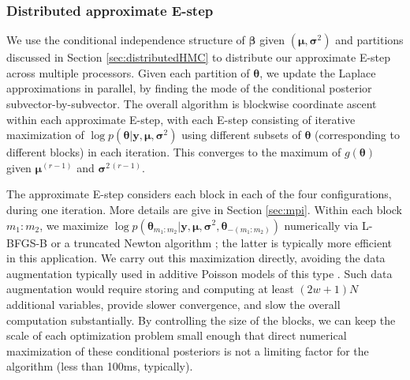 
\subsubsection{Distributed approximate E-step}
\label{sec:parallelization}

We use the conditional independence structure of $\bm \beta$ given $(\bm \mu, \bm \sigma^2)$ and partitions discussed in Section \ref{sec:distributedHMC} to distribute our approximate E-step across multiple processors.
Given each partition of $\bm \theta$, we update the Laplace approximations in parallel, by finding the mode of the conditional posterior subvector-by-subvector.
The overall algorithm is blockwise coordinate ascent within each approximate E-step, with each E-step consisting of iterative maximization of $\log p(\bm \theta | \bm y, \bm \mu, \bm \sigma^2 )$ using different subsets of $\bm \theta$ (corresponding to different blocks) in each iteration.
This converges to the maximum of $g(\bm \theta)$ given $\bm \mu^{(r-1)}$ and $\bm \sigma^{2\,(r-1)}$.

The approximate E-step considers each block in each of the four configurations, during one iteration. 
More details are give in Section \ref{sec:mpi}.
Within each block $m_1:m_2$, we maximize $\log p(\bm \theta_{m_1:m_2} | \bm y, \bm \mu, \bm \sigma^2, \bm \theta_{-(m_1:m_2)} )$ numerically via L-BFGS-B or a truncated Newton algorithm \citep{lbfgsb1997, Nash2000}; the latter is typically more efficient in this application.
We carry out this maximization directly, avoiding the data augmentation typically used in additive Poisson models of this type \citep[e.g.,][]{VanDykEtAl2006}. 
Such data augmentation would require storing and computing at least $(2w+1)N$ additional variables, provide slower convergence, and slow the overall computation substantially.
By controlling the size of the blocks, we can keep the scale of each optimization problem small enough that direct numerical maximization of these conditional posteriors is not a limiting factor for the algorithm (less than 100ms, typically).

